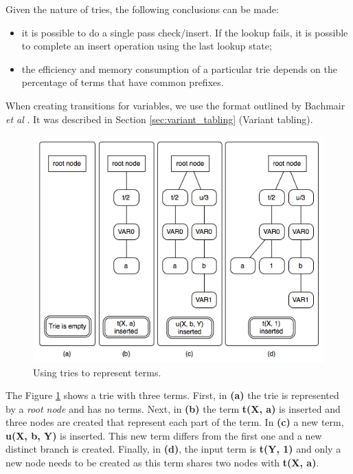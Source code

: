   Given the nature of tries, the following conclusions can be made:
  
  \begin{itemize}
    \item it is possible to do a single pass check/insert. If the lookup
    fails, it is possible to complete an insert operation using the last lookup state;
    \item the efficiency and memory consumption of a
    particular trie depends on the percentage of terms that have common prefixes.
  \end{itemize}
  
  When creating transitions for variables, we use the format outlined by Bachmair \textit{et al} \cite{Bachmair-93}.
  It was described in Section \ref{sec:variant_tabling} (Variant tabling).
  
  \begin{figure}[ht]
    \centering
      \includegraphics[scale=0.6]{tries.png}
    \caption{Using tries to represent terms.}
    \label{fig:tries_use}
  \end{figure}
  
  The Figure \ref{fig:tries_use} shows a trie with three terms. First, in \textbf{(a)} the trie is represented by a \textit{root node} and has
  no terms. Next, in \textbf{(b)} the term \textbf{t(X, a)} is inserted and three nodes are created that represent each part of the term.
  In \textbf{(c)} a new term, \textbf{u(X, b, Y)} is inserted. This new term differs from the first one and a new distinct branch is created.
  Finally, in \textbf{(d)}, the input term is \textbf{t(Y, 1)} and only a new node needs to be created as this term shares two nodes
  with \textbf{t(X, a)}.
  
